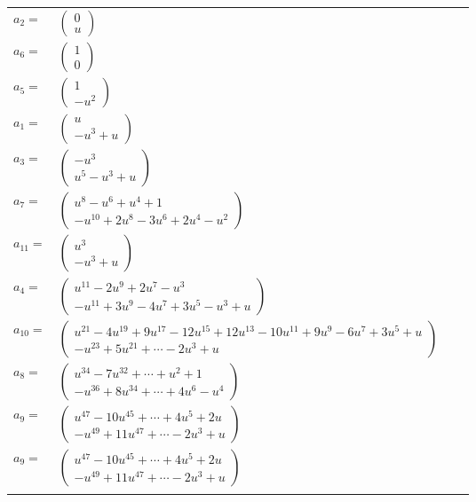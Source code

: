\documentclass[1p]{elsarticle_modified}
\theoremstyle{definition}
\begin{document}
\begin{tabular}{m{7pt} m{180pt} m{7pt} m{180pt} }
\flushright $a_{2}=$&$\begin{pmatrix}0\\u\end{pmatrix}$ \\
\flushright $a_{6}=$&$\begin{pmatrix}1\\0\end{pmatrix}$ \\
\flushright $a_{5}=$&$\begin{pmatrix}1\\- u^2\end{pmatrix}$ \\
\flushright $a_{1}=$&$\begin{pmatrix}u\\- u^3+u\end{pmatrix}$ \\
\flushright $a_{3}=$&$\begin{pmatrix}- u^3\\u^5- u^3+u\end{pmatrix}$ \\
\flushright $a_{7}=$&$\begin{pmatrix}u^8- u^6+u^4+1\\- u^{10}+2 u^8-3 u^6+2 u^4- u^2\end{pmatrix}$ \\
\flushright $a_{11}=$&$\begin{pmatrix}u^3\\- u^3+u\end{pmatrix}$ \\
\flushright $a_{4}=$&$\begin{pmatrix}u^{11}-2 u^9+2 u^7- u^3\\- u^{11}+3 u^9-4 u^7+3 u^5- u^3+u\end{pmatrix}$ \\
\flushright $a_{10}=$&$\begin{pmatrix}u^{21}-4 u^{19}+9 u^{17}-12 u^{15}+12 u^{13}-10 u^{11}+9 u^9-6 u^7+3 u^5+u\\- u^{23}+5 u^{21}+\cdots-2 u^3+u\end{pmatrix}$ \\
\flushright $a_{8}=$&$\begin{pmatrix}u^{34}-7 u^{32}+\cdots+u^2+1\\- u^{36}+8 u^{34}+\cdots+4 u^6- u^4\end{pmatrix}$ \\
\flushright $a_{9}=$&$\begin{pmatrix}u^{47}-10 u^{45}+\cdots+4 u^5+2 u\\- u^{49}+11 u^{47}+\cdots-2 u^3+u\end{pmatrix}$\\ \flushright $a_{9}=$&$\begin{pmatrix}u^{47}-10 u^{45}+\cdots+4 u^5+2 u\\- u^{49}+11 u^{47}+\cdots-2 u^3+u\end{pmatrix}$\\&\end{tabular}
\end{document}
